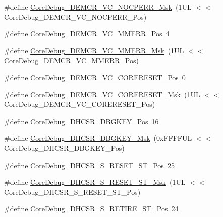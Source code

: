 \begin{DoxyCompactItemize}
\item 
\#define \mbox{\hyperlink{group___c_m_s_i_s___core_debug_ga03ee58b1b02fdbf21612809034562f1c}{Core\+Debug\+\_\+\+D\+E\+M\+C\+R\+\_\+\+V\+C\+\_\+\+N\+O\+C\+P\+E\+R\+R\+\_\+\+Msk}}~(1\+U\+L $<$$<$ Core\+Debug\+\_\+\+D\+E\+M\+C\+R\+\_\+\+V\+C\+\_\+\+N\+O\+C\+P\+E\+R\+R\+\_\+\+Pos)
\item 
\#define \mbox{\hyperlink{group___c_m_s_i_s___core_debug_ga444454f7c7748e76cd76c3809c887c41}{Core\+Debug\+\_\+\+D\+E\+M\+C\+R\+\_\+\+V\+C\+\_\+\+M\+M\+E\+R\+R\+\_\+\+Pos}}~4
\item 
\#define \mbox{\hyperlink{group___c_m_s_i_s___core_debug_gad420a9b60620584faaca6289e83d3a87}{Core\+Debug\+\_\+\+D\+E\+M\+C\+R\+\_\+\+V\+C\+\_\+\+M\+M\+E\+R\+R\+\_\+\+Msk}}~(1\+U\+L $<$$<$ Core\+Debug\+\_\+\+D\+E\+M\+C\+R\+\_\+\+V\+C\+\_\+\+M\+M\+E\+R\+R\+\_\+\+Pos)
\item 
\#define \mbox{\hyperlink{group___c_m_s_i_s___core_debug_ga9fcf09666f7063a7303117aa32a85d5a}{Core\+Debug\+\_\+\+D\+E\+M\+C\+R\+\_\+\+V\+C\+\_\+\+C\+O\+R\+E\+R\+E\+S\+E\+T\+\_\+\+Pos}}~0
\item 
\#define \mbox{\hyperlink{group___c_m_s_i_s___core_debug_ga906476e53c1e1487c30f3a1181df9e30}{Core\+Debug\+\_\+\+D\+E\+M\+C\+R\+\_\+\+V\+C\+\_\+\+C\+O\+R\+E\+R\+E\+S\+E\+T\+\_\+\+Msk}}~(1\+U\+L $<$$<$ Core\+Debug\+\_\+\+D\+E\+M\+C\+R\+\_\+\+V\+C\+\_\+\+C\+O\+R\+E\+R\+E\+S\+E\+T\+\_\+\+Pos)
\item 
\#define \mbox{\hyperlink{group___c_m_s_i_s___core_debug_gac91280edd0ce932665cf75a23d11d842}{Core\+Debug\+\_\+\+D\+H\+C\+S\+R\+\_\+\+D\+B\+G\+K\+E\+Y\+\_\+\+Pos}}~16
\item 
\#define \mbox{\hyperlink{group___c_m_s_i_s___core_debug_ga1ce997cee15edaafe4aed77751816ffc}{Core\+Debug\+\_\+\+D\+H\+C\+S\+R\+\_\+\+D\+B\+G\+K\+E\+Y\+\_\+\+Msk}}~(0x\+F\+F\+F\+F\+U\+L $<$$<$ Core\+Debug\+\_\+\+D\+H\+C\+S\+R\+\_\+\+D\+B\+G\+K\+E\+Y\+\_\+\+Pos)
\item 
\#define \mbox{\hyperlink{group___c_m_s_i_s___core_debug_ga6f934c5427ea057394268e541fa97753}{Core\+Debug\+\_\+\+D\+H\+C\+S\+R\+\_\+\+S\+\_\+\+R\+E\+S\+E\+T\+\_\+\+S\+T\+\_\+\+Pos}}~25
\item 
\#define \mbox{\hyperlink{group___c_m_s_i_s___core_debug_gac474394bcceb31a8e09566c90b3f8922}{Core\+Debug\+\_\+\+D\+H\+C\+S\+R\+\_\+\+S\+\_\+\+R\+E\+S\+E\+T\+\_\+\+S\+T\+\_\+\+Msk}}~(1\+U\+L $<$$<$ Core\+Debug\+\_\+\+D\+H\+C\+S\+R\+\_\+\+S\+\_\+\+R\+E\+S\+E\+T\+\_\+\+S\+T\+\_\+\+Pos)
\item 
\#define \mbox{\hyperlink{group___c_m_s_i_s___core_debug_ga2328118f8b3574c871a53605eb17e730}{Core\+Debug\+\_\+\+D\+H\+C\+S\+R\+\_\+\+S\+\_\+\+R\+E\+T\+I\+R\+E\+\_\+\+S\+T\+\_\+\+Pos}}~24
$$
\end{DoxyCompactItemize}
